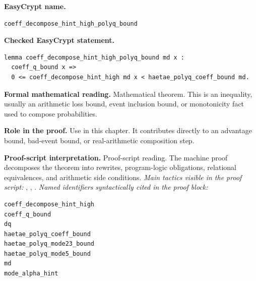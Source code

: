 \begin{formaltheorem}
\noindent\textbf{EasyCrypt name.}
\begin{lstlisting}[language=EasyCrypt,basicstyle=\ttfamily\scriptsize]
coeff_decompose_hint_high_polyq_bound
\end{lstlisting}
\noindent\textbf{Checked EasyCrypt statement.}
\begin{lstlisting}[language=EasyCrypt,basicstyle=\ttfamily\scriptsize]
lemma coeff_decompose_hint_high_polyq_bound md x :
  coeff_q_bound x =>
  0 <= coeff_decompose_hint_high md x < haetae_polyq_coeff_bound md.
\end{lstlisting}
\noindent\textbf{Formal mathematical reading.}
Mathematical theorem. This is an inequality, usually an arithmetic loss bound, event inclusion bound, or monotonicity fact used to compose probabilities.

\noindent\textbf{Role in the proof.}
Use in this chapter. It contributes directly to an advantage bound, bad-event bound, or real-arithmetic composition step.

\noindent\textbf{Proof-script interpretation.}
Proof-script reading. The machine proof decomposes the theorem into rewrites, program-logic obligations, relational equivalences, and arithmetic side conditions.
\emph{Main tactics visible in the proof script:} , , .
\emph{Named identifiers syntactically cited in the proof block:}
\begin{lstlisting}[language=EasyCrypt,basicstyle=\ttfamily\scriptsize]
coeff_decompose_hint_high
coeff_q_bound
dq
haetae_polyq_coeff_bound
haetae_polyq_mode23_bound
haetae_polyq_mode5_bound
md
mode_alpha_hint
\end{lstlisting}

\end{formaltheorem}

